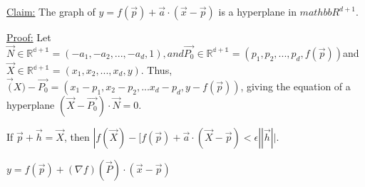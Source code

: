 \documentclass[11 pt, twoside]{article}
\begin{document}
\underline{Claim:}
The graph of $y = f(\vec{p}) + \vec{a} \cdot (\vec{x} - \vec{p})$ is a hyperplane in $mathbb{R^{d+1}}$.

\underline{Proof:}
Let $\vec{N} \in \mathbb{R^{d+1}} = (-a_1, -a_2, ..., -a_d, 1), and \vec{P_0} \in \mathbb{R^{d+1}} = (p_1, p_2, ..., p_d, f(\vec{p}))$and $\vec{X} \in \mathbb{R^{d+1}} = (x_1, x_2, ..., x_d, y)$. Thus, $\vec(X) - \vec{P_0} = (x_1 - p_1, x_2 - p_2, ... x_d - p_d, y - f(\vec{p}))$, giving the equation of a hyperplane $(\vec{X} - \vec{P_0}) \cdot \vec{N} = 0$.

If $\vec{p} + \vec{h} = \vec{X}$, then $|f(\vec{X}) - [f(\vec{p}) + \vec{a} \cdot (\vec{X} - \vec{p}) < \epsilon||\vec{h}||$.

$y = f(\vec{p}) + (\nabla f)(\vec{P}) \cdot (\vec{x} - \vec{p})$
\end{document}

